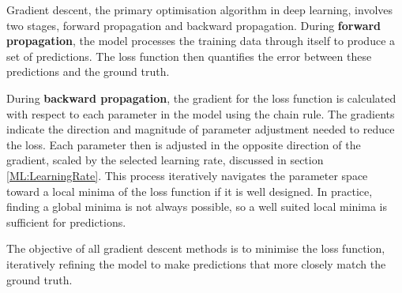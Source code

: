 Gradient descent, the primary optimisation algorithm in deep learning, involves two stages, forward propagation and backward propagation. During \textbf{forward  propagation}, the model processes the training data through itself to produce a set of predictions. The loss function then quantifies the error between these predictions and the ground truth.

During \textbf{backward propagation}, the gradient for the loss function is calculated with respect to each parameter in the model using the chain rule. The gradients indicate the direction and magnitude of parameter adjustment needed to reduce the loss. Each parameter then is adjusted in the opposite direction of the gradient, scaled by the selected learning rate, discussed in section \ref{ML:LearningRate}.  This process iteratively navigates the parameter space toward a local minima of the loss function if it is well designed. In practice, finding a global minima is not always possible, so a well suited local minima is sufficient for predictions.

The objective of all gradient descent methods is to minimise the loss function, iteratively refining the model to make predictions that more closely match the ground truth.


